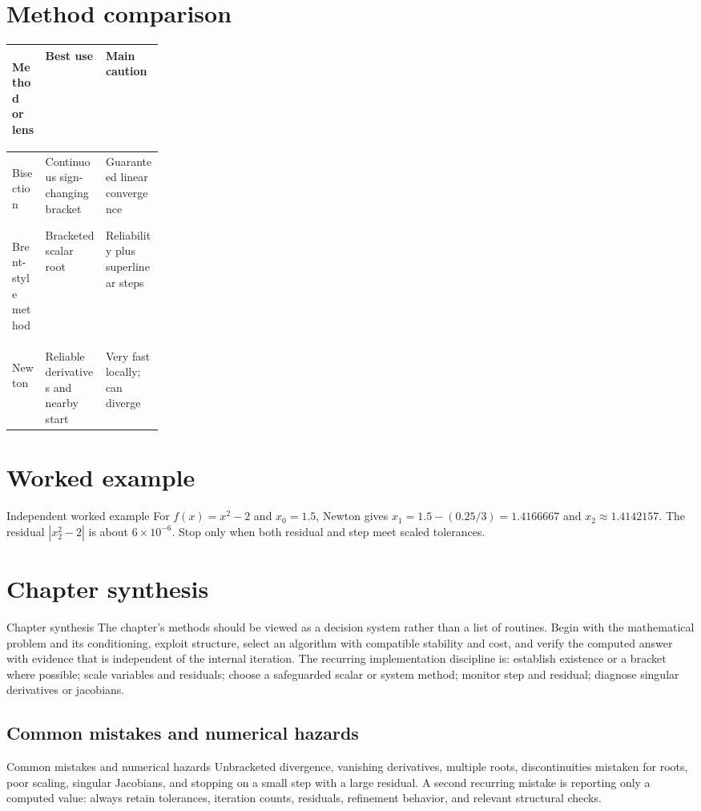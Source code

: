 \documentclass[10pt,letterpaper]{article}
\begin{document}
\section*{Method comparison}
\begin{center}
\small
\begin{tabularx}{\linewidth}{>{\bfseries\raggedright\arraybackslash}p{0.22\linewidth}XX}
\toprule
Method or lens & Best use & Main caution \\
\midrule
Bisection & Continuous sign-changing bracket & Guaranteed linear convergence \\
Brent-style method & Bracketed scalar root & Reliability plus superlinear steps \\
Newton & Reliable derivatives and nearby start & Very fast locally; can diverge \\
\bottomrule
\end{tabularx}
\end{center}

\section*{Worked example}
\begin{exambox}{Independent worked example}
For $f(x)=x^2-2$ and $x_0=1.5$, Newton gives $x_1=1.5-(0.25/3)=1.4166667$ and $x_2\approx1.4142157$.  The residual $|x_2^2-2|$ is about $6\times10^{-6}$.  Stop only when both residual and step meet scaled tolerances.
\end{exambox}

\section*{Chapter synthesis}
\begin{summarybox}{Chapter synthesis}
The chapter's methods should be viewed as a decision system rather than a list of routines.  Begin with the mathematical problem and its conditioning, exploit structure, select an algorithm with compatible stability and cost, and verify the computed answer with evidence that is independent of the internal iteration.  The recurring implementation discipline is: establish existence or a bracket where possible; scale variables and residuals; choose a safeguarded scalar or system method; monitor step and residual; diagnose singular derivatives or jacobians.
\end{summarybox}

\subsection*{Common mistakes and numerical hazards}
\begin{warnbox}{Common mistakes and numerical hazards}
Unbracketed divergence, vanishing derivatives, multiple roots, discontinuities mistaken for roots, poor scaling, singular Jacobians, and stopping on a small step with a large residual.  A second recurring mistake is reporting only a computed value: always retain tolerances, iteration counts, residuals, refinement behavior, and relevant structural checks.
\end{warnbox}
\end{document}
